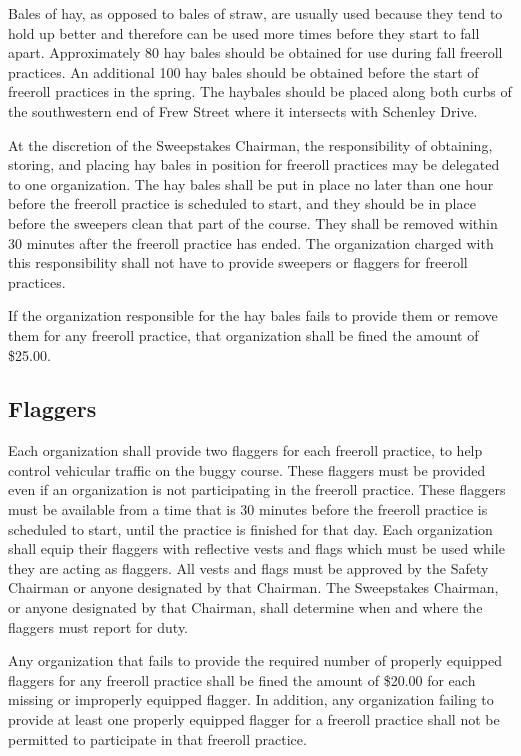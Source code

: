 	Bales of hay, as opposed to bales of straw, are usually used because they tend
	to hold up better and therefore can be used more times before they start to
	fall apart. Approximately 80 hay bales should be obtained for use during fall
	freeroll practices. An additional 100 hay bales should be obtained before the
	start of freeroll practices in the spring. The haybales should be placed along
	both curbs of the southwestern end of Frew Street where it intersects with
	Schenley Drive.

	At the discretion of the Sweepstakes Chairman, the responsibility of obtaining,
	storing, and placing hay bales in position for freeroll practices may be
	delegated to one organization. The hay bales shall be put in place no later
	than one hour before the freeroll practice is scheduled to start, and they
	should be in place before the sweepers clean that part of the course. They
	shall be removed within 30 minutes after the freeroll practice has ended. The
	organization charged with this responsibility shall not have to provide
	sweepers or flaggers for freeroll practices.

	If the organization responsible for the hay bales fails to provide them or
	remove them for any freeroll practice, that organization shall be fined the
	amount of \$25.00.

\subsection{Flaggers}

	Each organization shall provide two flaggers for each freeroll practice, to
	help control vehicular traffic on the buggy course. These flaggers must be
	provided even if an organization is not participating in the freeroll practice.
	These flaggers must be available from a time that is 30 minutes before the
	freeroll practice is scheduled to start, until the practice is finished for
	that day. Each organization shall equip their flaggers with reflective vests
	and flags which must be used while they are acting as flaggers. All vests and
	flags must be approved by the Safety Chairman or anyone designated by that
	Chairman. The Sweepstakes Chairman, or anyone designated by that Chairman,
	shall determine when and where the flaggers must report for duty.

	Any organization that fails to provide the required number of properly equipped
	flaggers for any freeroll practice shall be fined the amount of \$20.00 for
	each missing or improperly equipped flagger. In addition, any organization
	failing to provide at least one properly equipped flagger for a freeroll
	practice shall not be permitted to participate in that freeroll practice.

